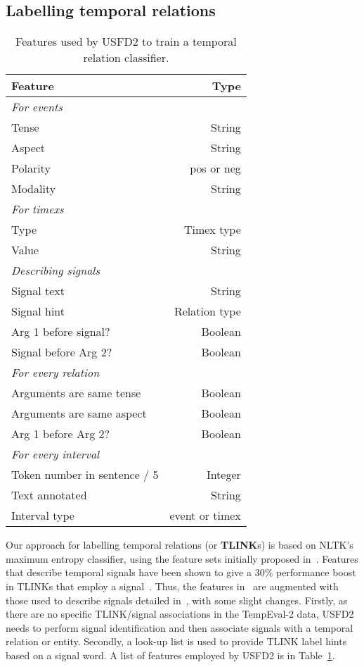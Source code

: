 \documentclass[11pt]{article}
\begin{document}
\subsection{Labelling temporal relations}
\label{tlink} 

\begin{table}
\begin{center}
\caption{Features used by USFD2 to train a temporal relation classifier.}
\label{tab:features}
\small
\begin{tabular}{| l | r |}
\hline
\textbf{Feature} & \textbf{Type} \\
\hline
\emph{For events} & \\
Tense & String \\
Aspect & String \\
Polarity & pos or neg \\
Modality & String \\
\hline
\emph{For timexs} & \\
Type & Timex type \\
Value & String \\
\hline
\emph{Describing signals} & \\
Signal text & String \\
Signal hint & Relation type \\
Arg 1 before signal? & Boolean \\
Signal before Arg 2? & Boolean \\
\hline
\emph{For every relation} & \\
Arguments are same tense & Boolean \\
Arguments are same aspect & Boolean \\
Arg 1 before Arg 2? & Boolean \\
\hline
\emph{For every interval} & \\
Token number in sentence / 5 & Integer \\
Text annotated & String \\
Interval type & event or timex \\
\hline
\end{tabular}
\end{center}
\end{table}
\normalsize

Our approach for labelling temporal relations (or \textbf{TLINK}s) is based on NLTK's maximum entropy classifier, using the feature sets initially proposed in~. Features that describe temporal signals have been shown to give a 30\% performance boost in TLINKs that employ a signal~\cite{derczynski2010signals}. Thus, the features in~ are augmented with those used to describe signals detailed in~, with some slight changes. Firstly, as there are no specific TLINK/signal associations in the TempEval-2 data, USFD2 needs to perform signal identification and then associate signals with a temporal relation or entity. Secondly, a look-up list is used to provide TLINK label hints based on a signal word. A list of features employed by USFD2 is in Table~\ref{tab:features}.
\end{document}
